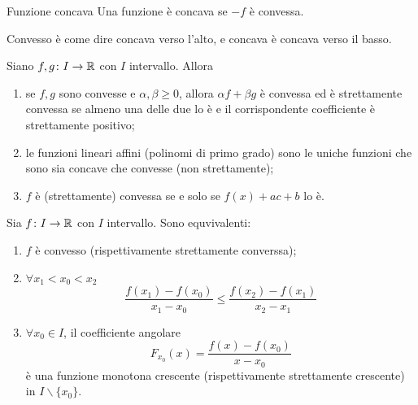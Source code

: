 \documentclass[a4paper]{article}
\begin{document}
\begin{snippetdefinition}{Funzione concava}
    Una funzione è concava se \(-f\) è convessa.
\end{snippetdefinition}

Convesso è come dire concava verso l'alto, e concava è concava verso il basso.

\begin{snippetproposition}{}
    Siano \(f,g \colon I \to \mathbb{R}\) con \(I\) intervallo. Allora
    \begin{enumerate}
        \item se \(f, g\) sono convesse e \(\alpha, \beta \geq 0\),
        allora \(\alpha f + \beta g\) è convessa ed è strettamente convessa
        se almeno una delle due lo è e il corrispondente coefficiente è strettamente positivo;
        \item le funzioni lineari affini (polinomi di primo grado) sono le uniche funzioni
        che sono sia concave che convesse (non strettamente);
        \item \(f\) è (strettamente) convessa se e solo se \(f(x) + ac + b\) lo è.
    \end{enumerate}
\end{snippetproposition}

\begin{snippettheorem}{}
    Sia \(f\colon I \to \mathbb{R}\) con \(I\) intervallo. Sono equvivalenti:
    \begin{enumerate}
        \item \(f\) è convesso (rispettivamente strettamente converssa);
        \item \(\forall x_1 < x_0 < x_2\)
        \[
            \frac{f(x_1) - f(x_0)}{x_1-x_0} \leq \frac{f(x_2) - f(x_1)}{x_2 - x_1}
        \]
        \item \(\forall x_0 \in I\), il coefficiente angolare
        \[
            F_{x_0}(x) = \frac{f(x) - f(x_0)}{x-x_0}
        \]
        è una funzione monotona crescente (rispettivamente strettamente crescente)
        in \(I \backslash \{x_0\}\).
    \end{enumerate}
\end{snippettheorem}
\end{document}
